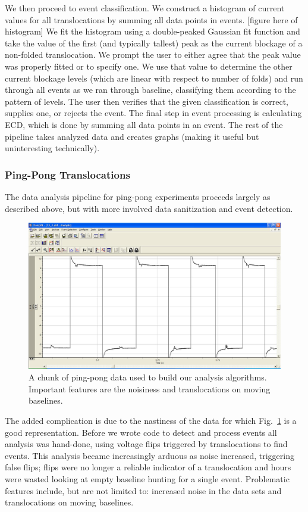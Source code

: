 \documentclass[aps,prl,preprint,groupedaddress]{revtex4}
\begin{document}
We then proceed to event classification.
We construct a histogram of current values for all translocations by summing all data points in events. [figure here of histogram]
We fit the histogram using a double-peaked Gaussian fit function and take the value of the first (and typically tallest) peak as the current blockage of a non-folded translocation.
We prompt the user to either agree that the peak value was properly fitted or to specify one.
We use that value to determine the other current blockage levels (which are linear with respect to number of folds) and run through all events as we ran through baseline, classifying them according to the pattern of levels.
The user then verifies that the given classification is correct, supplies one, or rejects the event.
The final step in event processing is calculating ECD, which is done by summing all data points in an event.
The rest of the pipeline takes analyzed data and creates graphs (making it useful but uninteresting technically).


\subsubsection{Ping-Pong Translocations}

The data analysis pipeline for ping-pong experiments proceeds largely as described above, but with more involved data sanitization and event detection.
\begin{figure}
\centering
\includegraphics[width=1\textwidth]{figures/good-ping-pong}
\caption{A chunk of ping-pong data used to build our analysis algorithms.
Important features are the noisiness and translocations on moving baselines.}
\label{fig:good-ping-pong}
\end{figure}
The added complication is due to the nastiness of the data for which Fig.~\ref{fig:good-ping-pong} is a good representation.
Before we wrote code to detect and process events all analysis was hand-done, using voltage flips triggered by translocations to find events.
This analysis became increasingly arduous as noise increased, triggering false flips; flips were no longer a reliable indicator of a translocation and hours were wasted looking at empty baseline hunting for a single event.
Problematic features include, but are not limited to: increased noise in the data sets and translocations on moving baselines.
\end{document}
